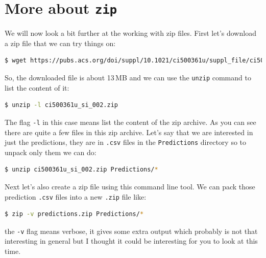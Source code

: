 \documentclass[watermark]{pbpreprint}
\begin{document}
\section{More about \texttt{zip}}
We will now look a bit further at the working with zip files. First let's
download a zip file that we can try things on:
%
\begin{lstlisting}[language=bash,escapechar={|},basicstyle=\ttfamily\footnotesize,breaklines=true,
           postbreak=\mbox{\textcolor{red}{$\nicearrow$}\space}]
$ wget https://pubs.acs.org/doi/suppl/10.1021/ci500361u/suppl_file/ci500361u_si_002.zip
\end{lstlisting}
So, the downloaded file is about 13\,MB and we can use the \texttt{unzip} command to list the content of it:
%
\begin{lstlisting}[language=bash,escapechar={|},basicstyle=\ttfamily\footnotesize]
$ unzip -l ci500361u_si_002.zip
\end{lstlisting}
The flag \texttt{-l} in this case means list the content of the zip archive. As you can
see there are quite a few files in this zip archive. Let's say that we are
interested in just the predictions, they are in \texttt{.csv} files in the
\texttt{Predictions} directory so to unpack only them we can do:
%
\begin{lstlisting}[language=bash,escapechar={|},basicstyle=\ttfamily\footnotesize]
$ unzip ci500361u_si_002.zip Predictions/*
\end{lstlisting}
Next let's also create a zip file using this command line tool. We can pack
those prediction \texttt{.csv} files into a new \texttt{.zip} file like:
%
\begin{lstlisting}[language=bash,escapechar={|},basicstyle=\ttfamily\footnotesize]
$ zip -v predictions.zip Predictions/* 
\end{lstlisting}
the \texttt{-v} flag means verbose, it gives some extra output which probably
is not that interesting in general but I thought it could be interesting
for you to look at this time. 
\end{document}

